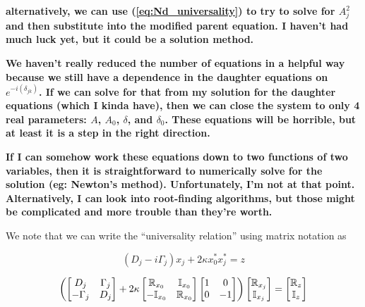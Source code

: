 \textbf{alternatively, we can use (\ref{eq:Nd_universality}) to try to solve for $A_j^2$ and then substitute into the modified parent equation. I haven't had much luck yet, but it could be a solution method.}

\textbf{We haven't really reduced the number of equations in a helpful way because we still have a dependence in the daughter equations on $e^{-i(\delta_{jk})}$. If we can solve for that from my solution for the daughter equations (which I kinda have), then we can close the system to only 4 real parameters: $A$, $A_0$, $\delta$, and $\delta_0$. These equations will be horrible, but at least it is a step in the right direction.}

\textbf{If I can somehow work these equations down to two functions of two variables, then it is straightforward to numerically solve for the solution (eg: Newton's method). Unfortunately, I'm not at that point. Alternatively, I can look into root-finding algorithms, but those might be complicated and more trouble than they're worth.}

We note that we can write the ``universality relation'' using matrix notation as

\begin{equation}
(D_j -i\Gamma_j)x_j + 2\kappa x_0^\ast x_j^\ast = z
\end{equation}

\begin{equation}
\left( 
\begin{bmatrix}
D_j & \Gamma_j \\
-\Gamma_j & D_j \\
\end{bmatrix}
+ 2\kappa \begin{bmatrix}
\mathbb{R}_{x_0} & \mathbb{I}_{x_0} \\
-\mathbb{I}_{x_0} & \mathbb{R}_{x_0} \\
\end{bmatrix}
\begin{bmatrix}
1 & 0 \\
0 & -1 \\
\end{bmatrix}
\right)
\begin{bmatrix}
\mathbb{R}_{x_j} \\
\mathbb{I}_{x_j} \\
\end{bmatrix}
= 
\begin{bmatrix}
\mathbb{R}_{z} \\
\mathbb{I}_{z} \\
\end{bmatrix}
\end{equation}

